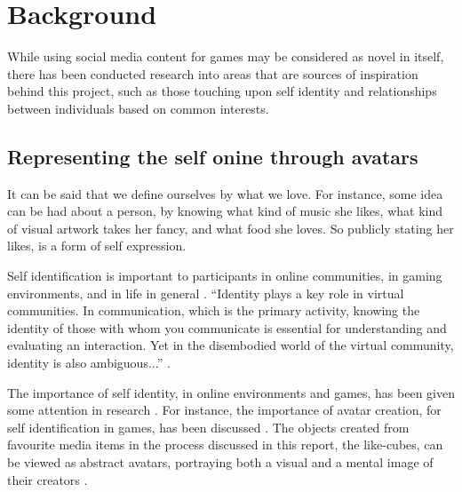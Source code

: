 \documentclass[conference]{IEEETran}
\begin{document}
\section{Background}
\label{sec:Background}

While using social media content for games may be considered as novel in itself, there has been conducted research into areas that are sources of inspiration behind this project, such as those touching upon self identity and relationships between individuals based on common interests.


\subsection{Representing the self onine through avatars}

It can be said that we define ourselves by what we love.  For instance, some idea can be had about a person, by knowing what kind of music she likes, what kind of visual artwork takes her fancy, and what food she loves.  So publicly stating her likes, is a form of self expression.


Self identification is important to participants in online communities, in gaming environments, and in life in general \cite{marwick2005selling}.  “Identity plays a key role in virtual communities. In communication, which is the primary activity, knowing the identity of those with whom you communicate is essential for understanding and evaluating an interaction.  Yet in the disembodied world of the virtual community, identity is also ambiguous...” \cite{kollock2002communities}.


The importance of self identity, in online environments and games, has been given some attention in research \cite{jones1997virtual,zhao2008identity,slater2002social,kollock2002communities,marwick2005selling,vitak2008facebook}.  For instance, the importance of avatar creation, for self identification in games, has been discussed \cite{waggoner2009my,trepte2010avatar}.  The objects created from favourite media items in the process discussed in this report, the like-cubes, can be viewed as abstract avatars, portraying both a visual and a mental image of their creators \cite{trepte2010avatar}.
\end{document}

